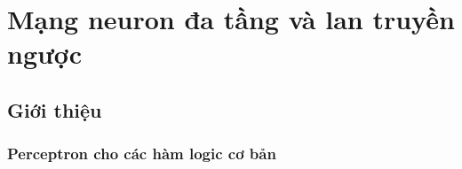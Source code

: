 \chapter{Mạng neuron đa tầng và lan truyền ngược}
\label{cha:mlp}
 
 
 
\section{Giới thiệu}
 
 
 
\subsection{Perceptron cho các hàm logic cơ bản}
 

